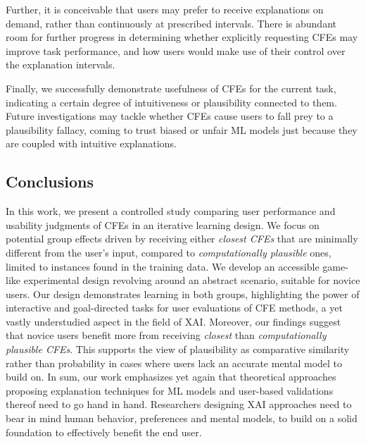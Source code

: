 Further, it is conceivable that users may prefer to receive explanations on demand, rather than continuously at prescribed intervals.
There is abundant room for further progress in determining whether explicitly requesting \glspl{CFE} may improve task performance, and how users would make use of their control over the explanation intervals.

Finally, we successfully demonstrate usefulness of \glspl{CFE} for the current task, indicating a certain degree of intuitiveness or plausibility connected to them. 
Future investigations may tackle whether \glspl{CFE} cause users to fall prey to a plausibility fallacy, coming to trust biased or unfair ML models just because they are coupled with intuitive explanations.

\subsection{Conclusions}\label{subsec:conclusion}
In this work, we present a controlled study comparing user performance and usability judgments of \glspl{CFE} in an iterative learning design.
We focus on potential group effects driven by receiving either \textit{closest \glspl{CFE}} that are minimally different from the user's input, compared to \textit{computationally plausible} ones, limited to instances found in the training data.
We develop an accessible game-like experimental design revolving around an abstract scenario, suitable for novice users.
Our design demonstrates learning in both groups, highlighting the power of interactive and goal-directed tasks for user evaluations of \gls{CFE} methods, a yet vastly understudied aspect in the field of \gls{XAI}.
Moreover, our findings suggest that novice users benefit more from receiving \textit{closest} than \textit{computationally plausible \glspl{CFE}}.
This supports the view of plausibility as comparative similarity rather than probability in cases where users lack an accurate mental model to build on.
In sum, our work emphasizes yet again that theoretical approaches proposing explanation techniques for \gls{ML} models and user-based validations thereof need to go hand in hand.
Researchers designing \gls{XAI} approaches need to bear in mind human behavior, preferences and mental models, to build on a solid foundation to effectively benefit the end user.